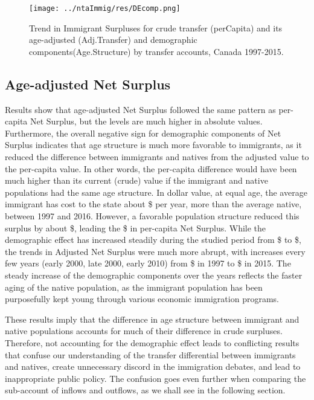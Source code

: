\begin{figure}[H]%
  \caption{Trend in Immigrant Surpluses for crude transfer (perCapita) and its age-adjusted (Adj.Transfer) and demographic components(Age.Structure) by transfer accounts, Canada 1997-2015.}
  \texttt{[image: ../ntaImmig/res/DEcomp.png]}%
  \label{fig:DEcomp}%
\end{figure}%

\subsection{Age-adjusted Net Surplus}

Results show that age-adjusted Net Surplus followed the same pattern as per-capita Net Surplus, but the levels are much higher in absolute values.
Furthermore, the overall negative sign for demographic components of Net Surplus indicates that age structure is much more favorable to immigrants, as it reduced the difference between immigrants and natives from the adjusted value to the per-capita value.
In other words, the per-capita difference would have been much higher than its current (crude) value if the immigrant and native populations had the same age structure.
In dollar value, at equal age, the average immigrant has cost to the state about \$ per year, more than the average native, between 1997 and 2016.
However, a favorable population structure reduced this surplus by about \$, leading the \$ in per-capita Net Surplus.
While the demographic effect has increased steadily during the studied period from \$ to \$, the trends in Adjusted Net Surplus were much more abrupt, with increases every few years (early 2000, late 2000, early 2010) from \$ in 1997 to \$ in 2015.
The steady increase of the demographic components over the years reflects the faster aging of the native population, as the immigrant population has been purposefully kept young through various economic immigration programs.

\vspace{0.7em}\par
These results imply that the difference in age structure between immigrant and native populations accounts for much of their difference in crude surpluses.
Therefore, not accounting for the demographic effect leads to conflicting results that confuse our understanding of the transfer differential between immigrants and natives, create unnecessary discord in the immigration debates, and lead to inappropriate public policy.
The confusion goes even further when comparing the sub-account of inflows and outflows, as we shall see in the following section.

